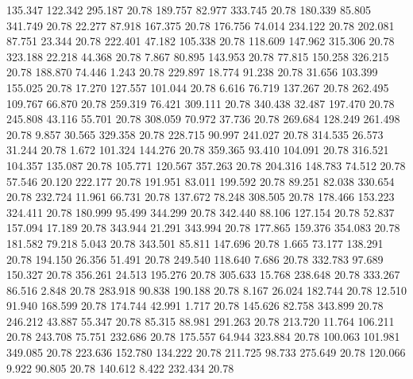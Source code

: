  135.347  122.342  295.187        20.78
 189.757   82.977  333.745        20.78
 180.339   85.805  341.749        20.78
  22.277   87.918  167.375        20.78
 176.756   74.014  234.122        20.78
 202.081   87.751   23.344        20.78
 222.401   47.182  105.338        20.78
 118.609  147.962  315.306        20.78
 323.188   22.218   44.368        20.78
   7.867   80.895  143.953        20.78
  77.815  150.258  326.215        20.78
 188.870   74.446    1.243        20.78
 229.897   18.774   91.238        20.78
  31.656  103.399  155.025        20.78
  17.270  127.557  101.044        20.78
   6.616   76.719  137.267        20.78
 262.495  109.767   66.870        20.78
 259.319   76.421  309.111        20.78
 340.438   32.487  197.470        20.78
 245.808   43.116   55.701        20.78
 308.059   70.972   37.736        20.78
 269.684  128.249  261.498        20.78
   9.857   30.565  329.358        20.78
 228.715   90.997  241.027        20.78
 314.535   26.573   31.244        20.78
   1.672  101.324  144.276        20.78
 359.365   93.410  104.091        20.78
 316.521  104.357  135.087        20.78
 105.771  120.567  357.263        20.78
 204.316  148.783   74.512        20.78
  57.546   20.120  222.177        20.78
 191.951   83.011  199.592        20.78
  89.251   82.038  330.654        20.78
 232.724   11.961   66.731        20.78
 137.672   78.248  308.505        20.78
 178.466  153.223  324.411        20.78
 180.999   95.499  344.299        20.78
 342.440   88.106  127.154        20.78
  52.837  157.094   17.189        20.78
 343.944   21.291  343.994        20.78
 177.865  159.376  354.083        20.78
 181.582   79.218    5.043        20.78
 343.501   85.811  147.696        20.78
   1.665   73.177  138.291        20.78
 194.150   26.356   51.491        20.78
 249.540  118.640    7.686        20.78
 332.783   97.689  150.327        20.78
 356.261   24.513  195.276        20.78
 305.633   15.768  238.648        20.78
 333.267   86.516    2.848        20.78
 283.918   90.838  190.188        20.78
   8.167   26.024  182.744        20.78
  12.510   91.940  168.599        20.78
 174.744   42.991    1.717        20.78
 145.626   82.758  343.899        20.78
 246.212   43.887   55.347        20.78
  85.315   88.981  291.263        20.78
 213.720   11.764  106.211        20.78
 243.708   75.751  232.686        20.78
 175.557   64.944  323.884        20.78
 100.063  101.981  349.085        20.78
 223.636  152.780  134.222        20.78
 211.725   98.733  275.649        20.78
 120.066    9.922   90.805        20.78
 140.612    8.422  232.434        20.78
